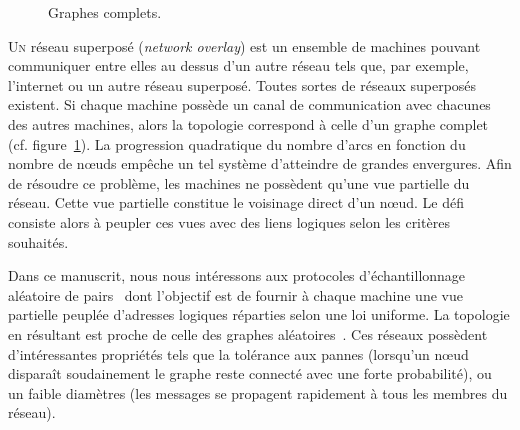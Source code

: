 




\begin{figure}
  \begin{center}
    
    \caption[Graphes complets]{\label{net:fig:completegraph}Graphes complets.}
  \end{center}
\end{figure}

\lettrine{U}n réseau superposé (\emph{network overlay}) est un ensemble de
machines pouvant communiquer entre elles au dessus d'un autre réseau tels que,
par exemple, l'internet ou un autre réseau superposé.  Toutes sortes de réseaux
superposés existent. Si chaque machine possède un canal de communication avec
chacunes des autres machines, alors la topologie correspond à celle d'un graphe
complet (cf. figure~\ref{net:fig:completegraph}). La progression quadratique du
nombre d'arcs en fonction du nombre de nœuds empêche un tel système d'atteindre
de grandes envergures. Afin de résoudre ce problème, les machines ne possèdent
qu'une vue partielle du réseau. Cette vue partielle constitue le voisinage
direct d'un nœud. Le défi consiste alors à peupler ces vues avec des liens
logiques selon les critères souhaités.

Dans ce manuscrit, nous nous intéressons aux protocoles d'échantillonnage
aléatoire de pairs~\cite{jelasity2007gossip} dont l'objectif est de fournir à
chaque machine une vue partielle peuplée d'adresses logiques réparties selon une
loi uniforme. La topologie en résultant est proche de celle des graphes
aléatoires~\cite{erdos1959random}. Ces réseaux possèdent d'intéressantes
propriétés tels que la tolérance aux pannes (lorsqu'un nœud disparaît
soudainement le graphe reste connecté avec une forte probabilité), ou un faible
diamètres (les messages se propagent rapidement à tous les membres du réseau).

